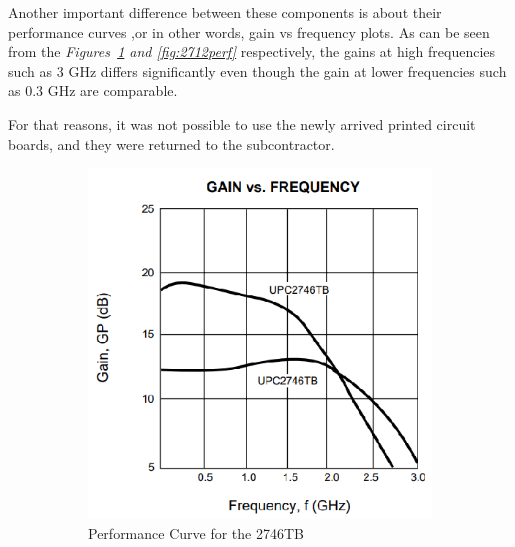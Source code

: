 	Another important difference between these components is about their performance curves ,or in other words, gain vs frequency plots. As can be seen from the \textit{Figures~\ref{fig:2746perf} and \ref{fig:2712perf}} respectively, the gains at high frequencies such as 3 GHz differs significantly even though the gain at lower frequencies such as 0.3 GHz are comparable. 
	
	For that reasons, it was not possible to use the newly arrived printed circuit boards, and they were returned to the subcontractor.


\begin{figure}[H]
	\setlength{\unitlength}{\textwidth} 
	\centering
	\begin{subfigure}{.5\textwidth}
  		\centering
  		\includegraphics[width=0.45\unitlength]{2746_perf}
  		\caption{\label{fig:2746perf}Performance Curve for the 2746TB }
	\end{subfigure}%
	\begin{subfigure}{.5\textwidth}
  		\centering

\end{subfigure}
\end{figure}
